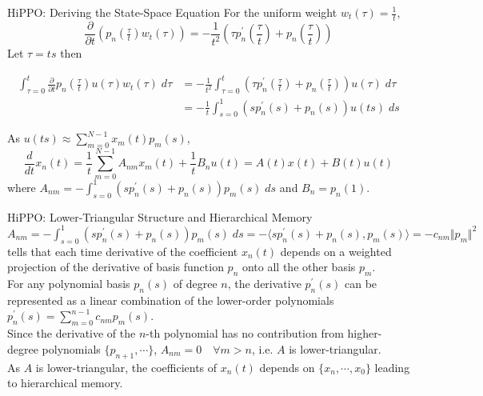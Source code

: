 \documentclass[xcolor=dvipsnames,aspectratio=169]{beamer}
\begin{document}
            \begin{frame}{HiPPO: Deriving the State-Space Equation}
                \footnotesize
                For the uniform weight $w_{t} (\tau) = \frac{1}{t}$, 
                $$\frac{\partial}{\partial t} (p_n(\tfrac{\tau}{t})w_t(\tau)) = -\frac{1}{t^2} (\tau p_n^\prime (\frac{\tau}{t}) + p_n (\frac{\tau}{t}))$$
                Let $\tau = ts$ then
                
                \begin{align*}
                     \int_{\tau = 0}^{t} \frac{\partial}{\partial t} p_n (\frac{\tau}{t}) u(\tau) w_t(\tau) \; d\tau & = -\frac{1}{t^{2}} \int_{\tau = 0}^{t} (\tau p_n^\prime (\frac{\tau}{t}) + p_n (\frac{\tau}{t})) u(\tau) \; d\tau \\
                     & = -\frac{1}{t} \int_{s = 0}^{1} (s  p_n^\prime (s) + p_n (s)) u(ts) \; ds
                \end{align*}
               
                As $u(ts) \approx \sum_{m = 0}^{N - 1} x_m(t) p_m(s)$, 
                $$\frac{d}{dt} x_{n}(t) = \frac{1}{t} \sum_{m = 0}^{N - 1} A_{nm} x_{m} (t) + \frac{1}{t} B_{n} u(t) = A(t) x(t) + B(t) u(t)$$ 
                where $A_{nm} = -\int_{s = 0}^{1} (s p_{n}^{\prime} (s) + p_{n} (s)) p_{m}(s) \; ds$ and $B_{n} = p_{n} (1)$.  
            \end{frame}

            \begin{frame}{HiPPO: Lower-Triangular Structure and Hierarchical Memory}
                $A_{nm} = -\int_{s = 0}^{1} (s p_{n}^{\prime} (s) + p_{n} (s)) p_{m}(s) \; ds = - \langle s p_{n}^{\prime} (s) + p_{n} (s), p_{m} (s) \rangle =  - c_{nm} \Vert p_{m} \Vert^{2}$ tells that each time derivative of the coefficient $x_{n} (t)$ depends on a weighted projection of the derivative of basis function $p_{n}$ onto all the other basis $p_{m}$. \\
                For any polynomial basis $p_{n}(s)$ of degree $n$, the derivative $p_{n}^{\prime} (s)$ can be represented as a linear combination of the lower-order polynomials $p_n^\prime(s) = \sum_{m=0}^{n-1} c_{nm} p_m(s)$. \\
                Since the derivative of the $n$-th polynomial has no contribution from higher-degree polynomials $\{ p_{n + 1}, \cdots \}$, $A_{nm} = 0 \quad \forall m > n$, i.e. $A$ is lower-triangular. \\
                As $A$ is lower-triangular, the coefficients of $x_{n} (t)$ depends on $\{ x_{n}, \cdots, x_{0} \}$ leading to hierarchical memory. 
            \end{frame}
            
\end{document}
